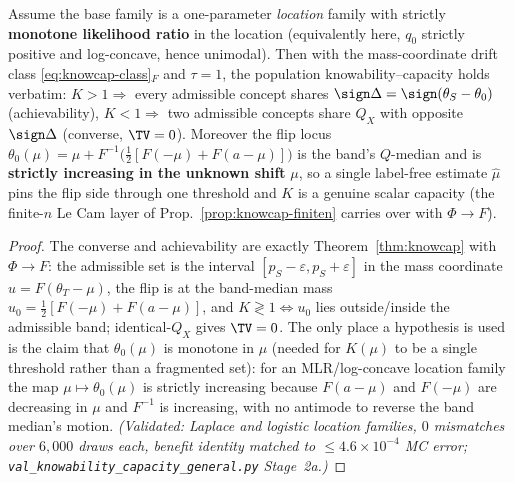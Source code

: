 \begin{theorem}[Stage 2, MLR/log-concave: matched $\tau=1$; PROVEN UNDER CONDITION]
\label{thm:gen-mlr}
Assume the base family is a one-parameter \emph{location} family with strictly
\textbf{monotone likelihood ratio} in the location (equivalently here, $q_0$ strictly
positive and log-concave, hence unimodal). Then with the mass-coordinate drift class
\eqref{eq:knowcap-class}$_F$ and $\tau=1$, the population knowability--capacity holds
verbatim: $K>1\Rightarrow$ every admissible concept shares $\sign\Delta=\sign(\theta_S-\theta_0)$
(achievability), $K<1\Rightarrow$ two admissible concepts share $Q_X$ with opposite
$\sign\Delta$ (converse, $\TV=0$). Moreover the flip locus
$\theta_0(\mu)=\mu+F^{-1}\!\big(\tfrac12[F(-\mu)+F(a-\mu)]\big)$ is the band's $Q$-median
and is \textbf{strictly increasing in the unknown shift} $\mu$, so a single label-free
estimate $\hat\mu$ pins the flip side through one threshold and $K$ is a genuine scalar
capacity (the finite-$n$ Le Cam layer of Prop.~\ref{prop:knowcap-finiten} carries over
with $\Phi\to F$).
\end{theorem}
\begin{proof}
The converse and achievability are exactly Theorem~\ref{thm:knowcap} with $\Phi\to F$:
the admissible set is the interval $[p_S-\varepsilon,p_S+\varepsilon]$ in the mass
coordinate $u=F(\theta_T-\mu)$, the flip is at the band-median mass
$u_0=\tfrac12[F(-\mu)+F(a-\mu)]$, and $K\gtrless1\iff u_0$ lies outside/inside the
admissible band; identical-$Q_X$ gives $\TV=0$. The only place a hypothesis is used is
the claim that $\theta_0(\mu)$ is monotone in $\mu$ (needed for $K(\mu)$ to be a single
threshold rather than a fragmented set): for an MLR/log-concave location family the map
$\mu\mapsto\theta_0(\mu)$ is strictly increasing because $F(a-\mu)$ and $F(-\mu)$ are
decreasing in $\mu$ and $F^{-1}$ is increasing, with no antimode to reverse the band
median's motion. \emph{(Validated: Laplace and logistic location families, $0$
mismatches over $6{,}000$ draws each, benefit identity matched to
$\le4.6\times10^{-4}$ MC error; \texttt{val\_knowability\_capacity\_general.py}
Stage~2a.)}
\end{proof}

